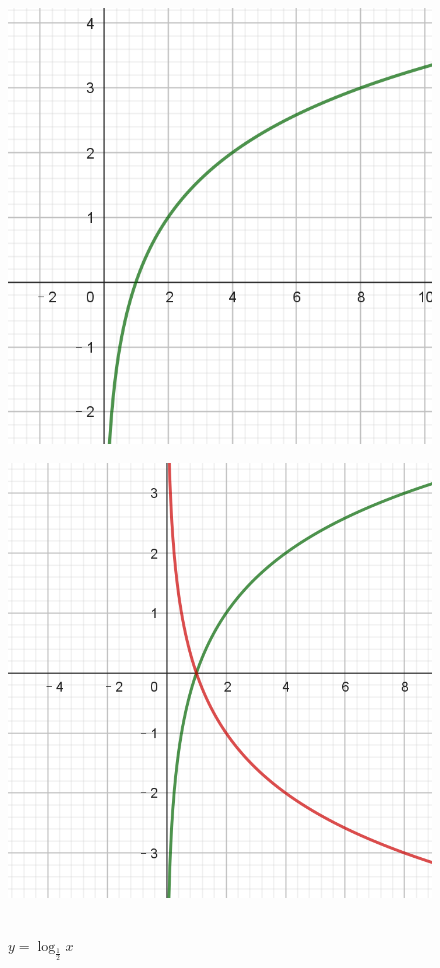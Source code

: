 \documentclass[a4paper,openany]{ctexbook}
\begin{document}
\begin{figure}
    \centering
    \begin{minipage}{0.4\textwidth}
        \centering
        \includegraphics[width=\textwidth]{image30.png}
        \caption{\(y=\log_2 x\)}\label{eec40c13-e9b5-44b4-8c1a-7912803aa638}
    \end{minipage}
    \hfill
    \begin{minipage}{0.4\textwidth}
        \centering
        \includegraphics[width=\textwidth]{image31.png}\
        \caption{\(y=\log_{\frac{1}{2}} x\)}\label{173fd789-10db-41a1-9363-807ea6703850}
    \end{minipage}
\end{figure}
\end{document}
